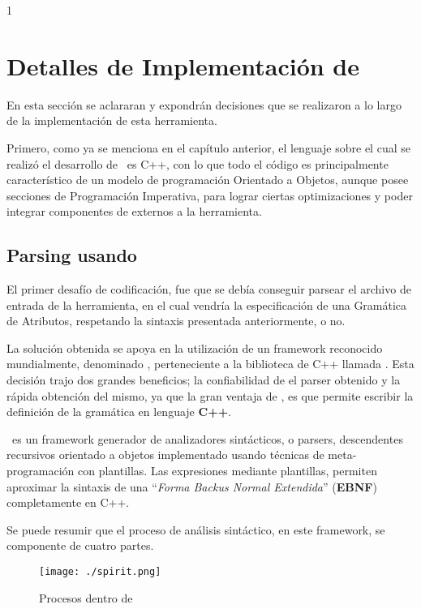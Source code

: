 1\chapter{Detalles de Implementación de \maggen}
\label{chap:implem}
\minitoc

En esta sección se aclararan y expondrán decisiones que se realizaron a lo largo de la implementación de esta herramienta.

Primero, como ya se menciona en el capítulo anterior, el lenguaje sobre el cual se realizó el desarrollo de \maggen\ es C++, con lo que todo el código es principalmente característico de un modelo de programación Orientado a Objetos, aunque posee secciones de Programación Imperativa, para lograr ciertas optimizaciones y poder integrar componentes de externos a la herramienta.

\section{Parsing usando \boost\ \spirit}

El primer desafío de codificación, fue que se debía conseguir parsear el archivo de entrada de la herramienta, en el cual vendría la especificación de una Gramática de Atributos, respetando la sintaxis presentada anteriormente, o no.

La solución obtenida se apoya en la utilización de un framework reconocido mundialmente, denominado \spirit, perteneciente a la biblioteca de C++ llamada \boost. Esta decisión trajo dos grandes beneficios; la confiabilidad de el parser obtenido y la rápida obtención del mismo, ya que la gran ventaja de \spirit, es que permite escribir la definición de la gramática en lenguaje \textbf{C++}.

\spirit\ es un framework generador de analizadores sintácticos, o parsers, descendentes recursivos orientado a objetos implementado usando técnicas de meta-programación con plantillas. Las expresiones mediante plantillas, permiten aproximar la sintaxis de una ``\textit{\textit{Forma Backus Normal Extendida}}'' (\textbf{EBNF}) completamente en C++.

Se puede resumir que el proceso de análisis sintáctico, en este framework, se componente de cuatro partes.

\begin{figure}\centering
\texttt{[image: ./spirit.png]}
\caption{Procesos dentro de \spirit}\label{procesoSpirit}
\end{figure}

